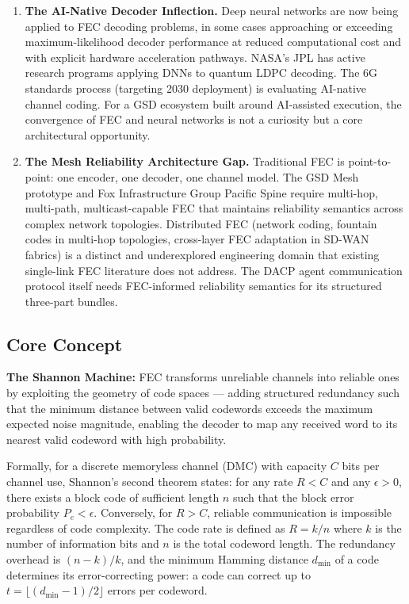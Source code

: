 \documentclass[11pt,letterpaper]{article}
\begin{document}
\begin{enumerate}[leftmargin=*, label=\textbf{\arabic*.}]
\item \textbf{The AI-Native Decoder Inflection.} Deep neural networks are now being applied to FEC decoding problems, in some cases approaching or exceeding maximum-likelihood decoder performance at reduced computational cost and with explicit hardware acceleration pathways. NASA's JPL has active research programs applying DNNs to quantum LDPC decoding. The 6G standards process (targeting 2030 deployment) is evaluating AI-native channel coding. For a GSD ecosystem built around AI-assisted execution, the convergence of FEC and neural networks is not a curiosity but a core architectural opportunity.

\item \textbf{The Mesh Reliability Architecture Gap.} Traditional FEC is point-to-point: one encoder, one decoder, one channel model. The GSD Mesh prototype and Fox Infrastructure Group Pacific Spine require multi-hop, multi-path, multicast-capable FEC that maintains reliability semantics across complex network topologies. Distributed FEC (network coding, fountain codes in multi-hop topologies, cross-layer FEC adaptation in SD-WAN fabrics) is a distinct and underexplored engineering domain that existing single-link FEC literature does not address. The DACP agent communication protocol itself needs FEC-informed reliability semantics for its structured three-part bundles.

\end{enumerate}

\subsection{Core Concept}

\textbf{The Shannon Machine:} FEC transforms unreliable channels into reliable ones by exploiting the geometry of code spaces --- adding structured redundancy such that the minimum distance between valid codewords exceeds the maximum expected noise magnitude, enabling the decoder to map any received word to its nearest valid codeword with high probability.

Formally, for a discrete memoryless channel (DMC) with capacity $C$ bits per channel use, Shannon's second theorem states: for any rate $R < C$ and any $\epsilon > 0$, there exists a block code of sufficient length $n$ such that the block error probability $P_e < \epsilon$. Conversely, for $R > C$, reliable communication is impossible regardless of code complexity. The code rate is defined as $R = k/n$ where $k$ is the number of information bits and $n$ is the total codeword length. The redundancy overhead is $(n-k)/k$, and the minimum Hamming distance $d_{\min}$ of a code determines its error-correcting power: a code can correct up to $t = \lfloor(d_{\min}-1)/2\rfloor$ errors per codeword.
\end{document}
